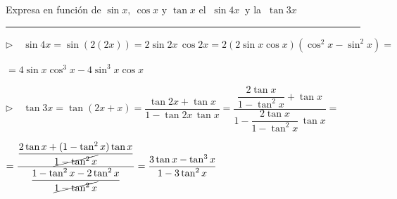 \begin{miejercicio}

Expresa en función de $\sin x,\ \cos x \text{ y } \tan x$ el $\ \sin 4x \ $ y la $\ \tan 3x$

\rule{250pt}{0.1pt}

\vspace{4mm} $\triangleright \quad \sin 4x=\sin(2(2x))=2\sin 2x \, \cos 2x=2(2\sin x \cos x)(\cos^2 x-\sin^2 x)=$

\vspace{2mm} $= 4\sin x \cos^3 x -  4\sin^3 x \cos x$

\vspace{4mm} $\triangleright \quad \tan 3x=\tan(2x+x)=\dfrac{\tan 2x + \tan x}{1-\tan 2x\, \tan x}= \dfrac{\dfrac{2\tan x}{1-\tan^2 x}+\tan x}{1- \dfrac{2\tan x }{1-\tan^2 x}\, \tan x}=$

\vspace{2mm}$=\dfrac{ \dfrac{
2\tan x+(1-\tan^2 x)\tan x  }{\cancel{1-\tan^2 x}}}{ \dfrac{1-\tan^2x-2\tan^2 x}{\cancel{1-\tan^2 x}}}=\dfrac{3\tan x-\tan^3 x}{1-3\tan^2 x}$
	
\end{miejercicio}




